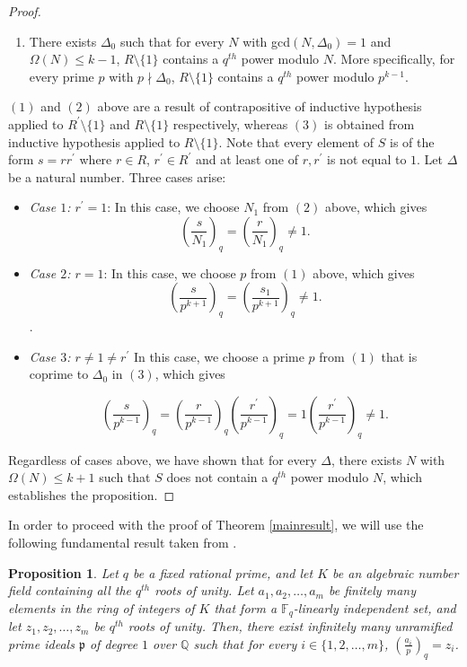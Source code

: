 \documentclass[12pt]{amsart}
\newtheorem{proposition}[theorem]{Proposition}
\begin{document}
\begin{proof}
\begin{enumerate}
    \item There exists $\Delta_{0}$ such that for every $N$ with gcd$(N, \Delta_{0}) = 1$ and $\Omega(N) \leq k - 1$, $R\setminus\{1\}$ contains a $q^{th}$ power modulo $N$. More specifically, for every prime $p$ with $p \nmid \Delta_{0}$, $R \setminus\{1\}$ contains a $q^{th}$ power modulo $p^{k-1}$.
\end{enumerate}
$(1)$ and $(2)$ above are a result of contrapositive of inductive hypothesis applied to $R^{\prime}\setminus\{1\}$ and $R\setminus\{1\}$ respectively, whereas $(3)$ is obtained from inductive hypothesis applied to $R\setminus\{1\}$. Note that every element of $S$ is of the form $s = rr^{\prime}$ where $r \in R$, $r^{\prime}\in R^{\prime}$ and at least one of $r, r^{\prime}$ is not equal to $1$. Let $\Delta$ be a natural number. Three cases arise:
\begin{itemize}
    \item \textit{Case $1$: $r^{\prime} = 1$}: In this case, we choose $N_{1}$ from $(2)$ above, which gives 
    \[ \left(\frac{s}{N_{1}}\right)_{q} = \left( \frac{r}{N_{1}} \right)_{q} \neq 1. \]

    \item \textit{Case $2$: $r = 1$}: In this case, we choose $p$ from $(1)$ above, which gives 
    \[ \left(\frac{s}{p^{k+1}}\right)_{q} = \left( \frac{s_{1}}{p^{k+1}} \right)_{q} \neq 1. \].

    \item \textit{Case $3$: $r \neq 1 \neq r^{\prime}$} In this case, we choose a prime $p$ from $(1)$ that is coprime to $\Delta_{0}$ in $(3)$, which gives

    \[ \left( \frac{s}{p^{k-1}} \right)_{q} = \left( \frac{r}{p^{k-1}} \right)_{q} \left( \frac{r^{\prime}}{p^{k-1}} \right)_{q} = 1 \left( \frac{r^{\prime}}{p^{k-1}} \right)_{q} \neq 1.  \]
\end{itemize}
Regardless of cases above, we have shown that for every $\Delta$, there exists $N$ with $\Omega(N) \leq k + 1$ such that $S$ does not contain a $q^{th}$ power modulo $N$, which establishes the proposition.
\end{proof}

In order to proceed with the proof of Theorem \ref{mainresult}, we will use the following fundamental result taken from \cite[Theorem 7.40, pp. 380]{Narkiewicz}.

\begin{proposition}
Let $q$ be a fixed rational prime, and let $K$ be an algebraic
number field containing all the $q^{th}$ roots of unity. Let $a_{1}, a_{2}, \ldots, a_{m}$ be finitely many elements in the ring of integers of $K$ that form a $\mathbb{F}_{q}$-linearly independent set, and let $z_{1}, z_{2}, \ldots, z_{m}$ be $q^{th}$ roots of unity. 
Then, there exist infinitely many unramified prime ideals $\mathfrak{p}$ of degree $1$ over $\mathbb{Q}$ such that for every $i \in\{1, 2, \ldots, m\}$, $\left(\frac{a_{i}}{p}\right)_{q} = z_{i}$.\label{characterresidue}
\end{proposition}
\end{document}

